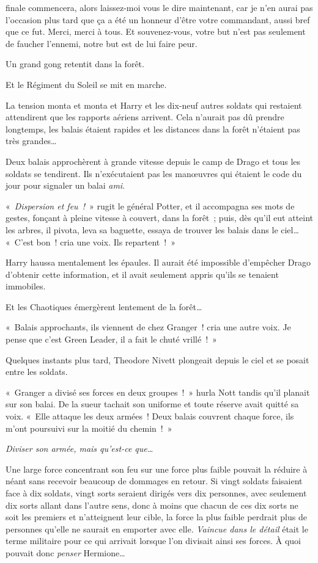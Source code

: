 finale commencera, alors laissez-moi vous le dire maintenant, car je n'en aurai pas l'occasion plus tard que ça a été un honneur d'être votre commandant, aussi bref que ce fut. Merci, merci à tous. Et souvenez-vous, votre but n'est pas seulement de faucher l'ennemi, notre but est de lui faire peur.

\later

Un grand gong retentit dans la forêt.

Et le Régiment du Soleil se mit en marche.

\later

La tension monta et monta et Harry et les dix-neuf autres soldats qui restaient attendirent que les rapports aériens arrivent. Cela n'aurait pas dû prendre longtemps, les balais étaient rapides et les distances dans la forêt n'étaient pas très grandes…

Deux balais approchèrent à grande vitesse depuis le camp de Drago et tous les soldats se tendirent. Ils n'exécutaient pas les manœuvres qui étaient le code du jour pour signaler un balai \emph{ami}.

«~\emph{Dispersion et feu~!}~» rugit le général Potter, et il accompagna ses mots de gestes, fonçant à pleine vitesse à couvert, dans la forêt~; puis, dès qu'il eut atteint les arbres, il pivota, leva sa baguette, essaya de trouver les balais dans le ciel…
«~C'est bon~! cria une voix. Ils repartent~!~»

Harry haussa mentalement les épaules. Il aurait été impossible d'empêcher Drago d'obtenir cette information, et il avait seulement appris qu'ils se tenaient immobiles.

Et les Chaotiques émergèrent lentement de la forêt…

«~Balais approchants, ils viennent de chez Granger~! cria une autre voix. Je pense que c'est Green Leader, il a fait le chuté vrillé~!~»

Quelques instants plus tard, Theodore Nivett plongeait depuis le ciel et se posait entre les soldats.

«~Granger a divisé ses forces en deux groupes~!~» hurla Nott tandis qu'il planait sur son balai. De la sueur tachait son uniforme et toute réserve avait quitté sa voix. «~Elle attaque les deux armées~! Deux balais couvrent chaque force, ils m'ont poursuivi sur la moitié du chemin~!~»

\emph{Diviser son armée, mais qu'est-ce que…}

Une large force concentrant son feu sur une force plus faible pouvait la réduire à néant sans recevoir beaucoup de dommages en retour. Si vingt soldats faisaient face à dix soldats, vingt sorts seraient dirigés vers dix personnes, avec seulement dix sorts allant dans l'autre sens, donc à moins que chacun de ces dix sorts ne soit les premiers et n'atteignent leur cible, la force la plus faible perdrait plus de personnes qu'elle ne saurait en emporter avec elle. \emph{Vaincue dans le détail} était le terme militaire pour ce qui arrivait lorsque l'on divisait ainsi ses forces. À quoi pouvait donc \emph{penser} Hermione…

